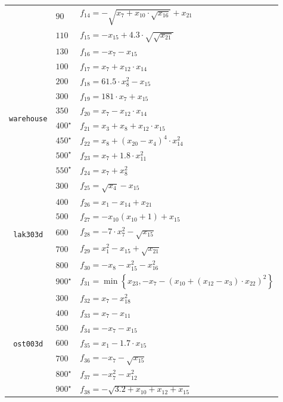\documentclass[letterpaper]{article}
\begin{document}
\begin{table}[t!]
{\begin{adjustbox}{width=0.09\columnwidth}
\begin{tabular}{c|l|l}
& $ 90 $ & $ f_{14} = - \sqrt{x_{7} + x_{10} \cdot \sqrt{x_{16}}} + x_{21} $ \\
& $ 110 $ & $ f_{15} = - x_{15} + 4.3 \cdot \sqrt{\sqrt{x_{21}}} $ \\
& $ 130 $ & $ f_{16} = - x_{7} - x_{15} $ \\
\hline
\multirow{8}{*}{\begin{turn}{90} {\tt warehouse} \end{turn}}
& $ 100 $ & $ f_{17} = x_{7} + x_{12} \cdot x_{14} $ \\
& $ 200 $ & $ f_{18} = 61.5 \cdot x_{8}^2 - x_{15} $ \\
& $ 300 $ & $ f_{19} = 181 \cdot x_{7} + x_{15} $ \\
& $ 350 $ & $ f_{20} = x_{7} - x_{12} \cdot x_{14} $ \\
& $ 400^\star $ & $ f_{21} = x_{3} + x_{8} + x_{12} \cdot x_{15} $ \\
& $ 450^\star $ & $ f_{22} = x_{8} + \left(x_{20} - x_{4}\right)^4 \cdot x_{14}^2 $ \\
& $ 500^\star $ & $ f_{23} = x_{7} + 1.8 \cdot x_{11}^2 $ \\
& $ 550^\star $ & $ f_{24} = x_{7} + x_{8}^2 $ \\
\hline
\multirow{7}{*}{\begin{turn}{90} {\tt lak303d} \end{turn}}
& $ 300 $ & $ f_{25} = \sqrt{x_{4}} - x_{15} $ \\
& $ 400 $ & $ f_{26} = x_{1} - x_{14} + x_{21} $ \\
& $ 500 $ & $ f_{27} = - x_{10}(x_{10} + 1) + x_{15} $ \\
& $ 600 $ & $ f_{28} = - 7 \cdot x_{7}^2 - \sqrt{x_{15}} $ \\
& $ 700 $ & $ f_{29} = x_{1}^2 - x_{15} + \sqrt{x_{21}} $ \\
& $ 800 $ & $ f_{30} = -x_{8} - x_{15}^2 - x_{16}^2 $ \\
& $ 900^\star $ & $ f_{31} = \min\left\{x_{23}, -x_{7} - \left(x_{10} + \left(x_{12} - x_{3}\right) \cdot x_{22}\right)^2\right\} $ \\
\hline
\multirow{7}{*}{\begin{turn}{90} {\tt ost003d} \end{turn}}
& $ 300 $ & $ f_{32} = x_{7} - x_{18}^2 $ \\
& $ 400 $ & $ f_{33} = x_{7} - x_{11} $ \\
& $ 500 $ & $ f_{34} = -x_{7} - x_{15} $ \\
& $ 600 $ & $ f_{35} = x_{1} - 1.7 \cdot x_{15} $ \\
& $ 700 $ & $ f_{36} = -x_{7} -\sqrt{x_{15}} $ \\
& $ 800^\star $ & $ f_{37} = - x_{7}^2 - x_{12}^2 $ \\
& $ 900^\star $ & $ f_{38} = -\sqrt{3.2 + x_{10} + x_{12} + x_{15}} $ \\ \bottomrule
\end{tabular}
\end{adjustbox}}
\end{table}
\end{document}
